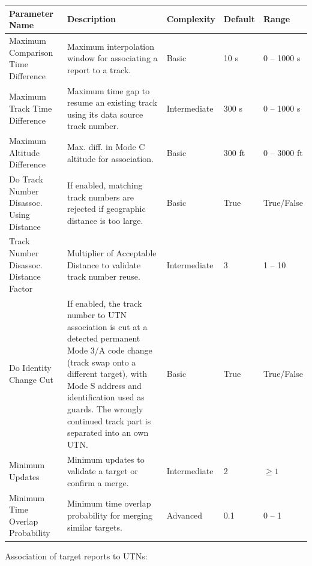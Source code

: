 \bigskip


\begin{table}[H]
    \centering
    \footnotesize
    \hspace*{-1.5cm}
    \begin{tabular}{|p{4.5cm}|p{6.5cm}|l|l|l|}
    \hline
    \textbf{Parameter Name} & \textbf{Description} & \textbf{Complexity} & \textbf{Default} & \textbf{Range} \\ \hline
    Maximum Comparison Time Difference & Maximum interpolation window for associating a report to a track. & Basic & 10 s & 0 -- 1000 s \\ \hline
    Maximum Track Time Difference & Maximum time gap to resume an existing track using its data source track number. & Intermediate & 300 s & 0 -- 1000 s \\ \hline
    Maximum Altitude Difference & Max. diff. in Mode C altitude for association. & Basic & 300 ft & 0 -- 3000 ft \\ \hline
    Do Track Number Disassoc. Using Distance & If enabled, matching track numbers are rejected if geographic distance is too large. & Basic & True & True/False \\ \hline
    Track Number Disassoc. Distance Factor & Multiplier of Acceptable Distance to validate track number reuse. & Intermediate & 3 & 1 -- 10 \\ \hline
    Do Identity Change Cut & If enabled, the track number to UTN association is cut at a detected permanent Mode 3/A code change (track swap onto a different target), with Mode S address and identification used as guards. The wrongly continued track part is separated into an own UTN. & Basic & True & True/False \\ \hline
    Minimum Updates & Minimum updates to validate a target or confirm a merge. & Intermediate & 2 & $\ge 1$ \\ \hline
    Minimum Time Overlap Probability & Minimum time overlap probability for merging similar targets. & Advanced & 0.1 & 0 -- 1 \\ \hline
    \end{tabular}
\end{table}

Association of target reports to UTNs:

